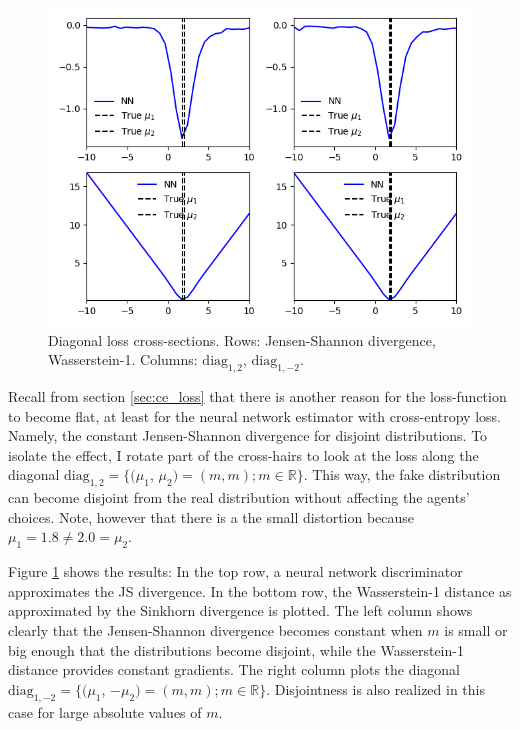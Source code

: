 \begin{figure}
    \includegraphics[width=\textwidth]{./Images/diagonal_loss_plots CE wasserstein-1.png} %
    \caption{Diagonal loss cross-sections. Rows: Jensen-Shannon divergence, Wasserstein-1. Columns: $\text{diag}_{1,2}$, $\text{diag}_{1,-2}$.}
    \label{fig:diagonal_loss_plots}
\end{figure}

Recall from section \ref{sec:ce_loss} that there is another reason for the loss-function to become flat,
at least for the neural network estimator with cross-entropy loss.
Namely, the constant Jensen-Shannon divergence for disjoint distributions.
To isolate the effect, I rotate part of the cross-hairs to look at the loss along the diagonal $\text{diag}_{1,2} = \{(\mu_1$, $\mu_2) = (m, m); m \in \mathbb{R}\}$.
This way, the fake distribution can become disjoint from the real distribution without affecting the agents' choices.
Note, however that there is a the small distortion because $\mu_1 = 1.8 \neq 2.0 = \mu_2$.

Figure \ref{fig:diagonal_loss_plots} shows the results:
In the top row, a neural network discriminator approximates the JS divergence.
In the bottom row, the Wasserstein-1 distance as approximated by the Sinkhorn divergence is plotted.
The left column shows clearly that the Jensen-Shannon divergence becomes constant when $m$ is small or big enough that the distributions become disjoint, while the Wasserstein-1 distance provides constant gradients.
The right column plots the diagonal $\text{diag}_{1,-2} = \{(\mu_1$, $-\mu_2) = (m, m); m \in \mathbb{R}\}$. Disjointness is also realized in this case for large absolute values of $m$.

